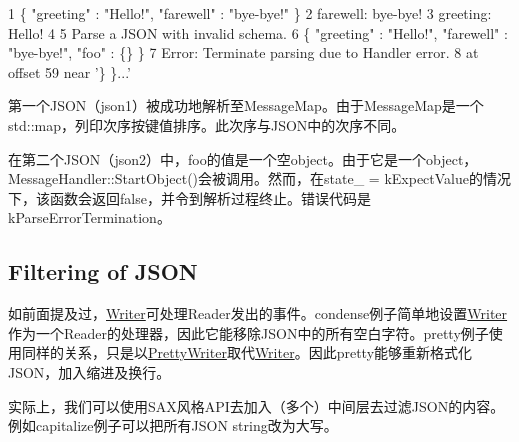 \begin{DoxyCode}
1 \{ "greeting" : "Hello!", "farewell" : "bye-bye!" \}
2 farewell: bye-bye!
3 greeting: Hello!
4 
5 Parse a JSON with invalid schema.
6 \{ "greeting" : "Hello!", "farewell" : "bye-bye!", "foo" : \{\} \}
7 Error: Terminate parsing due to Handler error.
8  at offset 59 near '\} \}...'
\end{DoxyCode}


第一个\+J\+S\+O\+N（{\ttfamily json1}）被成功地解析至{\ttfamily Message\+Map}。由于{\ttfamily Message\+Map}是一个{\ttfamily std\+::map}，列印次序按键值排序。此次序与\+J\+S\+O\+N中的次序不同。

在第二个\+J\+S\+O\+N（{\ttfamily json2}）中，{\ttfamily foo}的值是一个空object。由于它是一个object，{\ttfamily Message\+Handler\+::\+Start\+Object()}会被调用。然而，在{\ttfamily state\+\_\+ = k\+Expect\+Value}的情况下，该函数会返回{\ttfamily false}，并令到解析过程终止。错误代码是{\ttfamily k\+Parse\+Error\+Termination}。\hypertarget{md_Commun_Externe_RapidJSON_doc_sax.zh-cn_Filtering}{}\subsection{Filtering of J\+S\+ON}\label{md_Commun_Externe_RapidJSON_doc_sax.zh-cn_Filtering}
如前面提及过，{\ttfamily \hyperlink{class_writer}{Writer}}可处理{\ttfamily Reader}发出的事件。{\ttfamily condense}例子简单地设置{\ttfamily \hyperlink{class_writer}{Writer}}作为一个{\ttfamily Reader}的处理器，因此它能移除\+J\+S\+O\+N中的所有空白字符。{\ttfamily pretty}例子使用同样的关系，只是以{\ttfamily \hyperlink{class_pretty_writer}{Pretty\+Writer}}取代{\ttfamily \hyperlink{class_writer}{Writer}}。因此{\ttfamily pretty}能够重新格式化\+J\+S\+O\+N，加入缩进及换行。

实际上，我们可以使用\+S\+A\+X风格\+A\+P\+I去加入（多个）中间层去过滤\+J\+S\+O\+N的内容。例如{\ttfamily capitalize}例子可以把所有\+J\+S\+ON string改为大写。



